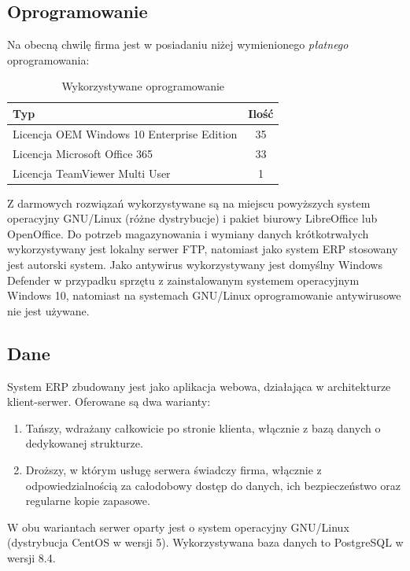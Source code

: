 \documentclass{article}
\begin{document}
        \subsection{Oprogramowanie}
            Na obecną chwilę firma jest w posiadaniu niżej wymienionego \textit{płatnego} oprogramowania:
            \begin{table}[H]
                \centering
                \begin{tabular}{ | l | c | }
                    \hline
                    \textbf{Typ} & \textbf{Ilość} \\
                    \hline
                    Licencja OEM Windows 10 Enterprise Edition & 35 \\
                    \hline
                    Licencja Microsoft Office 365 & 33 \\
                    \hline
                    Licencja TeamViewer Multi User & 1 \\
                    \hline
                \end{tabular}
                \caption{Wykorzystywane oprogramowanie}
            \end{table}

            Z darmowych rozwiązań wykorzystywane są na miejscu powyższych system operacyjny GNU/Linux (różne dystrybucje) i pakiet biurowy LibreOffice lub OpenOffice.
            Do potrzeb magazynowania i wymiany danych krótkotrwałych wykorzystywany jest lokalny serwer FTP, natomiast jako system ERP stosowany jest autorski system.
            Jako antywirus wykorzystywany jest domyślny Windows Defender w przypadku sprzętu z zainstalowanym systemem operacyjnym Windows 10, natomiast na systemach GNU/Linux oprogramowanie antywirusowe nie jest używane.
        \subsection{Dane}
            System ERP zbudowany jest jako aplikacja webowa, działająca w architekturze klient-serwer.
            Oferowane są dwa warianty:
            \begin{enumerate}
                \item Tańszy, wdrażany całkowicie po stronie klienta, włącznie z bazą danych o dedykowanej strukturze.
                \item Droższy, w którym usługę serwera świadczy firma, włącznie z odpowiedzialnością za całodobowy dostęp do danych, ich bezpieczeństwo oraz regularne kopie zapasowe.
            \end{enumerate}
            W obu wariantach serwer oparty jest o system operacyjny GNU/Linux (dystrybucja CentOS w wersji 5).
            Wykorzystywana baza danych to PostgreSQL w wersji 8.4.
\end{document}

